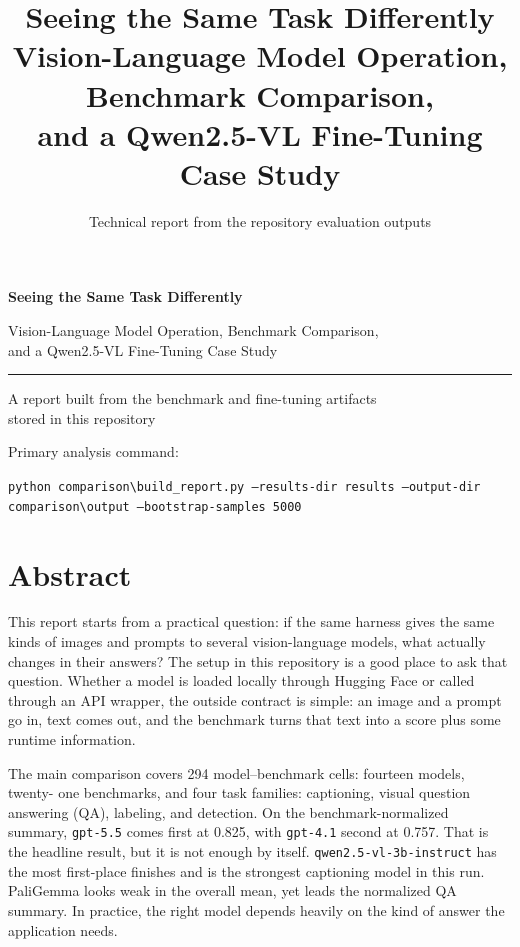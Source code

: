 \documentclass[11pt,a4paper]{report}
\title{\textbf{Seeing the Same Task Differently}\\[8pt]
Vision-Language Model Operation, Benchmark Comparison,\\
and a Qwen2.5-VL Fine-Tuning Case Study}
\author{Technical report from the repository evaluation outputs}
\date{}
\newcommand{\code}[1]{\texttt{#1}}
\begin{document}

\begin{titlepage}
\centering
\vspace*{34mm}
{\Huge\bfseries Seeing the Same Task Differently\par}
\vspace{10mm}
{\Large Vision-Language Model Operation, Benchmark Comparison,\\
and a Qwen2.5-VL Fine-Tuning Case Study\par}
\vspace{22mm}
\rule{0.68\textwidth}{0.5pt}\par
\vspace{12mm}
{\large A report built from the benchmark and fine-tuning artifacts\\
stored in this repository\par}
\vfill
{\normalsize Primary analysis command:\par}
\vspace{2mm}
\code{python comparison\textbackslash build\_report.py --results-dir results --output-dir comparison\textbackslash output --bootstrap-samples 5000}
\end{titlepage}
\setcounter{page}{2}

\chapter*{Abstract}
This report starts from a practical question: if the same harness gives the
same kinds of images and prompts to several vision-language models, what
actually changes in their answers?  The setup in this repository is a good
place to ask that question.  Whether a model is loaded locally through Hugging
Face or called through an API wrapper, the outside contract is simple: an image
and a prompt go in, text comes out, and the benchmark turns that text into a
score plus some runtime information.

The main comparison covers 294 model--benchmark cells: fourteen models, twenty-
one benchmarks, and four task families: captioning, visual question answering
(QA), labeling, and detection.  On the benchmark-normalized summary,
\code{gpt-5.5} comes first at 0.825, with \code{gpt-4.1} second at 0.757.
That is the headline result, but it is not enough by itself.
\code{qwen2.5-vl-3b-instruct} has the most first-place finishes and is the
strongest captioning model in this run.  PaliGemma looks weak in the overall
mean, yet leads the normalized QA summary.  In practice, the right model
depends heavily on the kind of answer the application needs.
\end{document}
